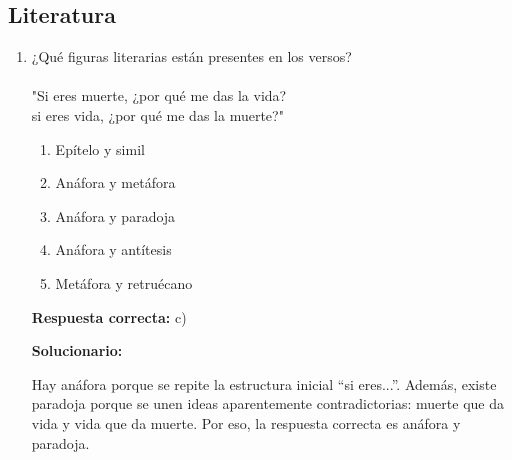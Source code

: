 \subsection*{Literatura}

\begin{enumerate}
	
	\item ¿Qué figuras literarias están presentes en los versos?\\\\
	"Si eres muerte, ¿por qué me das la vida?\\ 
	si eres vida, ¿por qué me das la muerte?"
	
	\begin{enumerate}[label=\alph*)]
		\item Epítelo y simil
		\item Anáfora y metáfora
		\item Anáfora y paradoja
		\item Anáfora y antítesis
		\item Metáfora y retruécano
	\end{enumerate}
	
	\textbf{Respuesta correcta:} c)
	
	\vspace{2mm}
	\textbf{Solucionario:}
	
	Hay anáfora porque se repite la estructura inicial ``si eres...''. Además, existe paradoja porque se unen ideas aparentemente contradictorias: muerte que da vida y vida que da muerte. Por eso, la respuesta correcta es anáfora y paradoja.
	
\end{enumerate}

